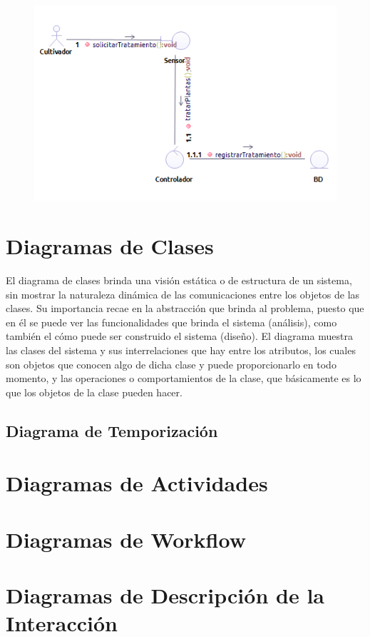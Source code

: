 \begin{figure}
	\centering
	\includegraphics[width=0.8\linewidth]{proyecto/imgs/comunicacionTierra}
	\caption{}
	\label{fig:comunicaciontierra}
\end{figure}
\section{Diagramas de Clases}
El diagrama de clases brinda una visión estática o de estructura de un sistema, sin mostrar la naturaleza dinámica de las comunicaciones entre los objetos de las clases. \cite{bruegge2002ingenieria}
Su importancia recae en la abstracción que brinda al problema, puesto que en él se puede ver las funcionalidades que brinda el sistema (análisis), como también el cómo puede ser construido el sistema (diseño). 
El diagrama muestra las clases del sistema y sus interrelaciones que hay entre los atributos, los cuales son objetos que conocen algo de dicha clase y puede proporcionarlo en todo momento, y las operaciones o comportamientos de la clase, que básicamente es lo que los objetos de la clase pueden hacer.

\subsection{Diagrama de Temporización}

\newpage



\section{Diagramas de Actividades}

\newpage

\section{Diagramas de Workflow}

\newpage

\section{Diagramas de Descripción de la Interacción}

\newpage